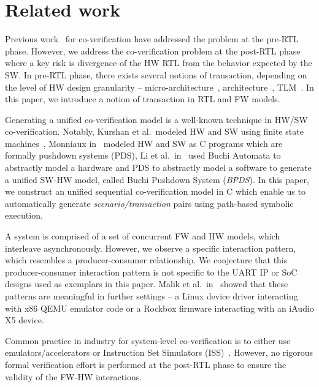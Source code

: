 \documentclass[sigconf]{acmart}
\begin{document}
\section{Related work}

Previous work~\cite{codes14,codes15,fmcad13,memocode06} for 
co-verification have addressed the problem at the pre-RTL phase. 
However, we address the co-veri\-fi\-cation problem at the post-RTL
phase~\cite{fase10,vlsid13} where a key risk is divergence of the 
HW RTL from the behavior expected by the SW. In pre-RTL phase, 
there exists several notions of transaction, depending on the level 
of HW design granularity -- micro-architecture~\cite{mcbmq},
architecture~\cite{mcbmq}, TLM~\cite{tlm-book,hvc}. In this paper, 
we introduce a notion of transaction in RTL and FW models.      

Generating a unified co-verification model is a well-known 
technique in HW/SW co-verification.  Notably, Kurshan et al.~modeled HW and 
SW using finite state machines~\cite{fmsd02}, Monniaux in~\cite{emsoft07} modeled
HW and SW as C programs which are formally pushdown systems (PDS), 
Li et al.~in~\cite{fase10} used Buchi Automata to abstractly
model a hardware and PDS to abstractly model a software to generate a unified SW-HW model, 
called Buchi Pushdown System ({\em BPDS}).  In this paper, we construct an unified 
sequential co-verification model in C which enable us to automatically 
generate {\em scenario/transaction} pairs using path-based symbolic execution. 

A system is comprised of a set of concurrent FW and HW models, which
interleave asynchronously.  However, we observe a specific interaction
pattern, which resembles a producer-consumer relationship.  We conjecture
that this producer-consumer interaction pattern is not specific to the UART
IP or SoC designs used as exemplars in this paper.  Malik et
al.~in~\cite{hvc} showed that these patterns are meaningful in further
settings -- a Linux device driver interacting with x86 QEMU emulator code or
a Rockbox firmware interacting with an iAudio X5 device.

Common practice in industry for system-level co-verification is to 
either use emulators/accelerators or Instruction Set Simulators 
(ISS)~\cite{coverif-book}.  However, no rigorous formal verification 
effort is performed at the post-RTL phase to ensure the validity of the
FW-HW interactions.  
\end{document}
